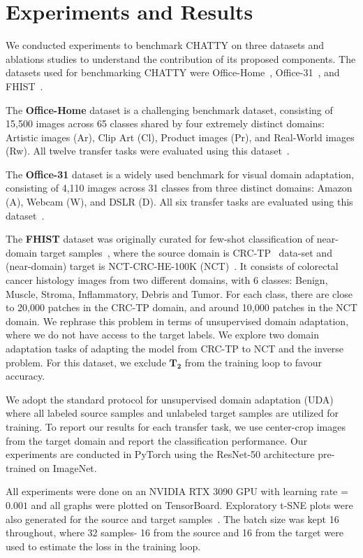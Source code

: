 \documentclass[10pt,twocolumn,letterpaper]{article}
\begin{document}
\section{Experiments and Results}

We conducted experiments to benchmark CHATTY on three datasets and ablations studies to understand the contribution of its proposed components. The datasets used for benchmarking CHATTY were Office-Home~\cite{office-home}, Office-31~\cite{office31}, and FHIST~\cite{fhist}. 

The \textbf{Office-Home} dataset is a challenging benchmark dataset, consisting of 15,500 images across 65 classes shared by four extremely distinct domains: Artistic images (Ar), Clip Art (Cl), Product images (Pr), and Real-World images (Rw). All twelve transfer tasks were evaluated using this dataset~\cite{office-home}. 

The \textbf{Office-31} dataset is a widely used benchmark for visual domain adaptation, consisting of 4,110 images across 31 classes from three distinct domains: Amazon (A), Webcam (W), and DSLR (D). All six transfer tasks are evaluated using this dataset~\cite{office31}. 

The \textbf{FHIST} dataset was originally curated for few-shot classification of near-domain target samples~\cite{fhist}, where the source domain is CRC-TP~\cite{crc} data-set and (near-domain) target is NCT-CRC-HE-100K (NCT)~\cite{nct}. It consists of colorectal cancer histology images from two different domains, with 6 classes: Benign, Muscle, Stroma, Inflammatory, Debris and Tumor. For each class, there are close to 20,000 patches in the CRC-TP domain, and around 10,000 patches in the NCT domain. We rephrase this problem in terms of unsupervised domain adaptation, where we do not have access to the target labels. We explore two domain adaptation tasks of adapting the model from CRC-TP to NCT and the inverse problem. For this dataset, we exclude $\mathbf{T_2}$ from the training loop to favour accuracy.

We adopt the standard protocol for unsupervised domain adaptation (UDA) where all labeled source samples and unlabeled target samples are utilized for training. To report our results for each transfer task, we use center-crop images from the target domain and report the classification performance. Our experiments are conducted in PyTorch using the ResNet-50 architecture pre-trained on ImageNet. 

All experiments were done on an NVIDIA RTX 3090 GPU with learning rate = $0.001$ and all graphs were plotted on TensorBoard. Exploratory t-SNE plots were also generated for the source and target samples~\cite{tsne}. The batch size was kept 16 throughout, where 32 samples- 16 from the source and 16 from the target were used to estimate the loss in the training loop.
\end{document}
